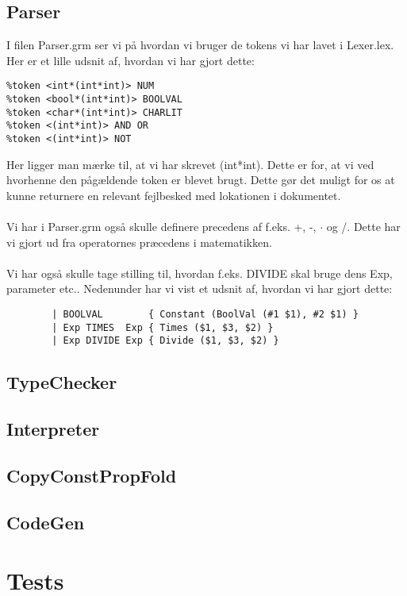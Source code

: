 \documentclass[a4paper]{article}
\begin{document}
\subsection{Parser}
I filen Parser.grm ser vi på hvordan vi bruger de tokens vi har lavet i Lexer.lex. Her er et lille udsnit af, hvordan vi har gjort dette:\\
\begin{lstlisting}
%token <int*(int*int)> NUM
%token <bool*(int*int)> BOOLVAL
%token <char*(int*int)> CHARLIT
%token <(int*int)> AND OR
%token <(int*int)> NOT
\end{lstlisting}
Her ligger man mærke til, at vi har skrevet (int*int). Dette er for, at vi ved hvorhenne den pågældende token er blevet brugt. Dette gør det muligt for os at kunne returnere en relevant fejlbesked med lokationen i dokumentet.\\ \\
Vi har i Parser.grm også skulle definere precedens af f.eks. +, -, $\cdot$ og 
/. Dette har vi gjort ud fra operatornes præcedens i matematikken.\\ \\
Vi har også skulle tage stilling til, hvordan f.eks. DIVIDE skal bruge dens Exp, parameter etc.. Nedenunder har vi vist et udsnit af, hvordan vi har gjort dette:
\begin{lstlisting}
        | BOOLVAL        { Constant (BoolVal (#1 $1), #2 $1) }
        | Exp TIMES  Exp { Times ($1, $3, $2) }
        | Exp DIVIDE Exp { Divide ($1, $3, $2) }
\end{lstlisting}
\subsection{TypeChecker}
\subsection{Interpreter}
\subsection{CopyConstPropFold}
\subsection{CodeGen}
\section{Tests}
\end{document}
